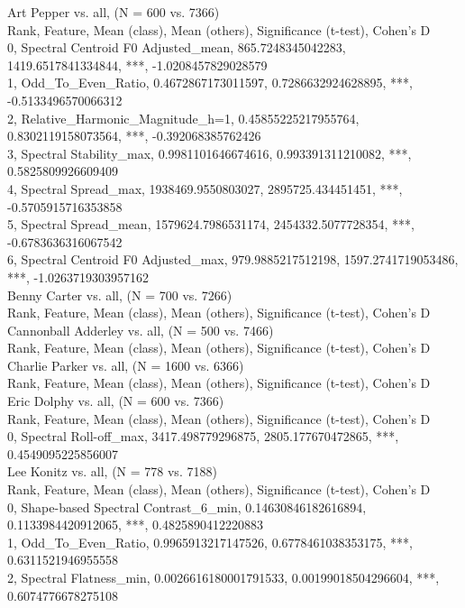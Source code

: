 Art Pepper vs. all, (N = 600 vs. 7366)\\
Rank, Feature, Mean (class), Mean (others), Significance (t-test), Cohen's D\\
0, Spectral Centroid F0 Adjusted_mean, 865.7248345042283, 1419.6517841334844, ***, -1.0208457829028579\\
1, Odd_To_Even_Ratio, 0.4672867173011597, 0.7286632924628895, ***, -0.5133496570066312\\
2, Relative_Harmonic_Magnitude_h=1, 0.45855225217955764, 0.8302119158073564, ***, -0.392068385762426\\
3, Spectral Stability_max, 0.9981101646674616, 0.993391311210082, ***, 0.5825809926609409\\
4, Spectral Spread_max, 1938469.9550803027, 2895725.434451451, ***, -0.5705915716353858\\
5, Spectral Spread_mean, 1579624.7986531174, 2454332.5077728354, ***, -0.6783636316067542\\
6, Spectral Centroid F0 Adjusted_max, 979.9885217512198, 1597.2741719053486, ***, -1.0263719303957162\\
Benny Carter vs. all, (N = 700 vs. 7266)\\
Rank, Feature, Mean (class), Mean (others), Significance (t-test), Cohen's D\\
Cannonball Adderley vs. all, (N = 500 vs. 7466)\\
Rank, Feature, Mean (class), Mean (others), Significance (t-test), Cohen's D\\
Charlie Parker vs. all, (N = 1600 vs. 6366)\\
Rank, Feature, Mean (class), Mean (others), Significance (t-test), Cohen's D\\
Eric Dolphy vs. all, (N = 600 vs. 7366)\\
Rank, Feature, Mean (class), Mean (others), Significance (t-test), Cohen's D\\
0, Spectral Roll-off_max, 3417.498779296875, 2805.177670472865, ***, 0.4549095225856007\\
Lee Konitz vs. all, (N = 778 vs. 7188)\\
Rank, Feature, Mean (class), Mean (others), Significance (t-test), Cohen's D\\
0, Shape-based Spectral Contrast_6_min, 0.14630846182616894, 0.1133984420912065, ***, 0.4825890412220883\\
1, Odd_To_Even_Ratio, 0.9965913217147526, 0.6778461038353175, ***, 0.6311521946955558\\
2, Spectral Flatness_min, 0.0026616180001791533, 0.00199018504296604, ***, 0.6074776678275108\\
